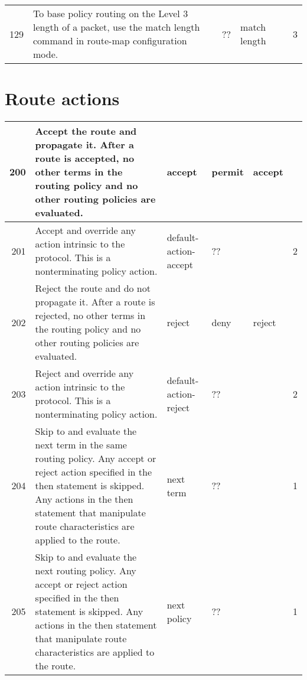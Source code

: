 \documentclass[letterpaper]{article}
\begin{document}
\begin{center}
\begin{supertabular}{|r |p{6cm} |p{2cm} |p{2cm} |p{2cm} |r|}
129 &
To base policy routing on the Level 3 length of a packet, use the match length
command in route-map configuration mode.
& ?? & match length &  & 3 \\

\end{supertabular}
\end{center}

\section{Route actions}
\begin{center}
\tabletail{
\hline
}
\begin{supertabular}{|r |p{6cm} |p{2cm} |p{2cm} |p{2cm} |r|}
\hline

200 &
Accept the route and propagate it. After a route is accepted, no other
terms in the routing policy and no other routing policies are evaluated.
& accept & permit &  accept &\\
\hline

201 &
Accept and override any action intrinsic to the protocol. This is a
nonterminating policy action.
& default-action-accept & ?? &  & 2 \\
\hline

202 &
Reject the route and do not propagate it. After a route is rejected, no
other terms in the routing policy and no other routing policies are
evaluated.
& reject & deny & reject &\\
\hline

203 &
Reject and override any action intrinsic to the protocol. This is a
nonterminating policy action.
& default-action-reject & ?? &  & 2 \\
\hline

204 &
Skip to and evaluate the next term in the same routing policy. Any accept or
reject action specified in the then statement is skipped. Any actions in the
then statement that manipulate route characteristics are applied to the route.
& next term & ?? &  & 1 \\
\hline

205 &
Skip to and evaluate the next routing policy. Any accept or reject action
specified in the then statement is skipped. Any actions in the then statement
that manipulate route characteristics are applied to the route.
& next policy & ?? &  & 1 \\
\hline


\end{supertabular}
\end{center}
\end{document}
